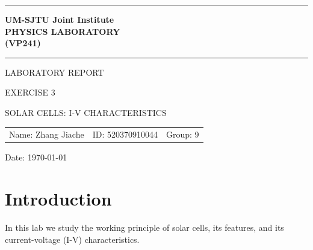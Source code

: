 \documentclass[12pt, a4paper]{article}
\begin{document}
\pagestyle{plain}

\begin{titlepage}

	\begin{center}	

	\vspace{10ex}

	\hrule

	\vspace{2ex}

	\textbf{\Large{UM-SJTU} \Large{J}\large{oint} \Large{I}\large{nstitute} \\
	\Large{P}\large{HYSICS} \Large{L}\large{ABORATORY} \\
	\large{(}\Large{V}\large{P241)}}\\
	
	\vspace{2ex}

	\hrule
	
	\vspace{25ex}
	
	\Large{L}\large{ABORATORY} \Large{R}\large{EPORT}

	\vspace{6ex}

	\large{E}\normalsize{XERCISE 3}

	\vspace{4ex}

	\large SOLAR CELLS: I-V CHARACTERISTICS

	\vspace{4ex}

	\begin{center}
		\begin{tabular}{lll}
		Name: Zhang Jiache & ID: 520370910044 & Group: 9
		\end{tabular}
	\end{center}

	{\large Date: \today}
	
	\end{center}
	
\end{titlepage}

\newpage

\section{Introduction}
In this lab we study the working principle of solar cells, its features, and its current-voltage 
(I-V) characteristics.
\end{document}
